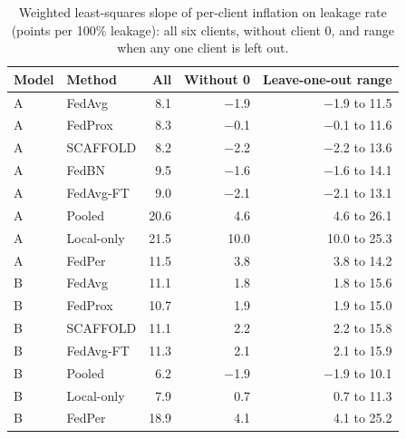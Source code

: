 \documentclass[10pt]{article}
\begin{document}
\begin{table}[!htbp]
\centering
\footnotesize
\caption{Weighted least-squares slope of per-client inflation on leakage rate (points per 100\% leakage): all six clients, without client 0, and range when any one client is left out.}
\label{tab:s3dr}
\begin{tabular}{@{}llrrr@{}}
\toprule
Model & Method & All & Without 0 & Leave-one-out range \\
\midrule
A & FedAvg & 8.1 & $-$1.9 & $-$1.9 to 11.5 \\
A & FedProx & 8.3 & $-$0.1 & $-$0.1 to 11.6 \\
A & SCAFFOLD & 8.2 & $-$2.2 & $-$2.2 to 13.6 \\
A & FedBN & 9.5 & $-$1.6 & $-$1.6 to 14.1 \\
A & FedAvg-FT & 9.0 & $-$2.1 & $-$2.1 to 13.1 \\
A & Pooled & 20.6 & 4.6 & 4.6 to 26.1 \\
A & Local-only & 21.5 & 10.0 & 10.0 to 25.3 \\
A & FedPer & 11.5 & 3.8 & 3.8 to 14.2 \\
B & FedAvg & 11.1 & 1.8 & 1.8 to 15.6 \\
B & FedProx & 10.7 & 1.9 & 1.9 to 15.0 \\
B & SCAFFOLD & 11.1 & 2.2 & 2.2 to 15.8 \\
B & FedAvg-FT & 11.3 & 2.1 & 2.1 to 15.9 \\
B & Pooled & 6.2 & $-$1.9 & $-$1.9 to 10.1 \\
B & Local-only & 7.9 & 0.7 & 0.7 to 11.3 \\
B & FedPer & 18.9 & 4.1 & 4.1 to 25.2 \\
\bottomrule
\end{tabular}
\end{table}
\end{document}
